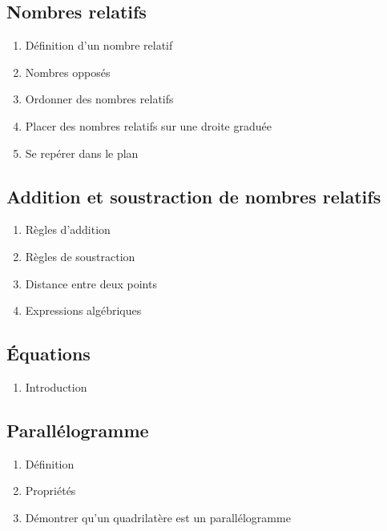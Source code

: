 \subsection{Nombres relatifs}\label{ch_5_rels}
\begin{enumerate}
	\item Définition d'un nombre relatif
	\item Nombres opposés
	\item Ordonner des nombres relatifs
	\item Placer des nombres relatifs sur une droite graduée
	\item Se repérer dans le plan	
\end{enumerate}

\subsection{Addition et soustraction de nombres relatifs}\label{ch_5_add_rels}
\begin{enumerate}
	\item Règles d'addition
	\item Règles de soustraction
	\item Distance entre deux points
	\item Expressions algébriques
\end{enumerate}

\subsection{\'Equations}\label{ch_5_eq}
\begin{enumerate}
	\item Introduction
\end{enumerate}

\subsection{Parallélogramme}\label{ch_5_para}
\begin{enumerate}
	\item Définition
	\item Propriétés
	\item Démontrer qu'un quadrilatère est un parallélogramme
\end{enumerate}

